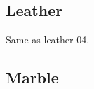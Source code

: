 \clearpage
\renewcommand{\matName}{Leather}
\subsection{\matName}

\renewcommand{\imgNumber}{01}
{}{}
\renewcommand{\imgNumber}{02}
{}{}
\renewcommand{\imgNumber}{03}
{}{}
\renewcommand{\imgNumber}{04}
{}{}
\renewcommand{\imgNumber}{05}
{}{Same as leather 04.}
\renewcommand{\imgNumber}{06}
{}{}
\renewcommand{\imgNumber}{07}
{}{}
\renewcommand{\imgNumber}{08}
{}{}
\renewcommand{\imgNumber}{09}
{}{}
\renewcommand{\imgNumber}{10}
{}{}
\renewcommand{\imgNumber}{11}
{}{}
\renewcommand{\imgNumber}{12}
{}{}

\clearpage
\renewcommand{\matName}{Marble}
\subsection{\matName}

\renewcommand{\imgNumber}{01}
{}{}
\renewcommand{\imgNumber}{02}
{}{}
\renewcommand{\imgNumber}{03}
{}{}
\renewcommand{\imgNumber}{04}
{}{}
\renewcommand{\imgNumber}{05}
{}{}
\renewcommand{\imgNumber}{06}
{}{}
\renewcommand{\imgNumber}{07}
{}{}
\renewcommand{\imgNumber}{08}
{}{}
\renewcommand{\imgNumber}{09}
{}{}
\renewcommand{\imgNumber}{10}
{}{}
\renewcommand{\imgNumber}{11}
{}{}
\renewcommand{\imgNumber}{12}
{}{}

